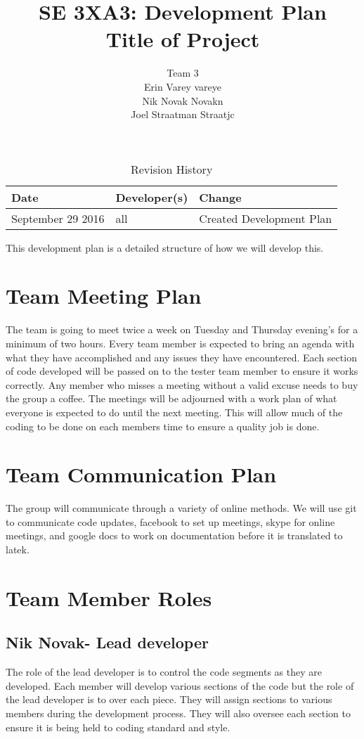 \documentclass{article}
\title{SE 3XA3: Development Plan\\Title of Project}
\author{Team 3
		\\ Erin Varey vareye
		\\ Nik Novak Novakn
		\\ Joel Straatman Straatjc
}
\date{}
\begin{document}
\begin{table}[hp]
\caption{Revision History} \label{TblRevisionHistory}
\begin{tabularx}{\textwidth}{llX}
\toprule
\textbf{Date} & \textbf{Developer(s)} & \textbf{Change}\\
\midrule
September 29 2016 & all & Created Development Plan\\

\bottomrule
\end{tabularx}
\end{table}
\newpage
\maketitle
This development plan is a detailed structure of how we will develop this.
\section{Team Meeting Plan}
The team is going to meet twice a week on Tuesday and Thursday evening's for a minimum of two hours. Every team member is expected to bring an agenda with what they have accomplished and any issues they have encountered. Each section of code developed will be passed on to the tester team member to ensure it works correctly. Any member who misses a meeting without a valid excuse needs to buy the group a coffee. The meetings will be adjourned with a work plan of what everyone is expected to do until the next meeting. This will allow much of the coding to be done on each members time to ensure a quality job is done. 
\section{Team Communication Plan}
The group will communicate through a variety of online methods. We will use git to communicate code updates, facebook to set up meetings, skype for online meetings, and google docs to work on documentation before it is translated to latek.
\section{Team Member Roles}
\subsection{Nik Novak- Lead developer}
The role of the lead developer is to control the code segments as they are developed. Each member will develop various sections of the code but the role of the lead developer is to over each piece. They will assign sections to various members during the development process. They will also oversee each section to ensure it is being held to coding standard and style. 
\end{document}
